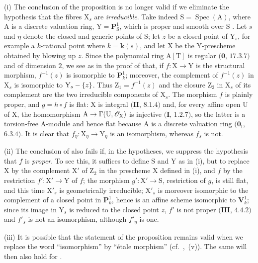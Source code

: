 \begin{remarks}[21.12.17]
\label{IV.21.12.17}
(i)
The conclusion of the proposition  is no longer valid if we eliminate the hypothesis that the fibres $\mathrm{X}_s$ are \emph{irreducible}.
Take indeed $\mathrm{S}=\operatorname{Spec}(\mathrm{A})$, where $\mathrm{A}$ is a discrete valuation ring, $\mathrm{Y}=\mathbf{P}^1_{\mathrm{S}}$, which is proper and smooth over $\mathrm{S}$ .
Let $s$ and $\eta$ denote the closed and generic points of $\mathrm{S}$; let $z$ be a closed point of $\mathrm{Y}_s$, for example a $k$-rational point where $k=\boldsymbol{k}(s)$, and let $\mathrm{X}$ be the $\mathrm{Y}$-prescheme obtained by blowing up $z$.
Since the polynomial ring $\mathrm{A}[\mathrm{T}]$ is regular $(\mathbf{0}$, $17.3.7)$ and of dimension $2$, we see as in the proof of  that, if $f:\mathrm{X}\to\mathrm{Y}$ is the structural morphism, $f^{-1}(z)$ is isomorphic to $\mathbf{P}^1_k$; moreover, the complement of $f^{-1}(z)$ in $\mathrm{X}_s$ is isomorphic to $\mathrm{Y}_s-\{z\}$.  Thus $\mathrm{Z}_1=f^{-1}(z)$ and the closure $\mathrm{Z}_2$ in $\mathrm{X}_s$ of its complement are the two irreducible components of $\mathrm{X}_s$.
The morphism $f$ is plainly proper, and $g=h\circ f$ is flat: $\mathrm{X}$ is integral $(\mathbf{II}$, $8.1.4)$ and, for every affine open $\mathrm{U}$ of $\mathrm{X}$, the homomorphism $\mathrm{A}\to\Gamma(\mathrm{U},\mathscr{O}_{\mathrm{X}})$ is injective $(\mathbf{I}$, $1.2.7)$, so the latter is a torsion-free A-module and hence flat because $\mathrm{A}$ is a discrete valuation ring $(\mathbf{0}_{\mathrm{I}}$, $6.3.4)$.
It is clear that $f_\eta:\mathrm{X}_\eta\to\mathrm{Y}_\eta$ is an isomorphism, whereas $f_s$ is not.

(ii)
The conclusion of  also fails if, in the hypotheses, we suppress the hypothesis that $f$ is \emph{proper}. To see this, it suffices to define $\mathrm{S}$ and $\mathrm{Y}$ as in (i), but to replace $\mathrm{X}$ by the complement $\mathrm{X}'$ of $\mathrm{Z}_2$ in the prescheme $\mathrm{X}$ defined in (i), and $f$ by the restriction $f':\mathrm{X}'\to\mathrm{Y}$ of $f$; the morphism $g':\mathrm{X}'\to\mathrm{S}$, restriction of $g$, is still flat, and this time $\mathrm{X}'_s$ is geometrically irreducible; $\mathrm{X}'_s$ is moreover isomorphic to the complement of a closed point in $\mathbf{P}^1_k$, hence is an affine scheme isomorphic to $\mathbf{V}^1_k$; since its image in $\mathrm{Y}_s$ is reduced to the closed point $z$, $f'$ is not proper $(\mathbf{III}$, $4.4.2)$ and $f'_s$ is not an isomorphism, although $f'_\eta$ is one.

(iii)
It is possible that the statement of the proposition  remains valid when we replace the word ``isomorphism'' by ``\'etale morphism'' (cf.\ ,~(v)).
The same will then also hold for .
\end{remarks}

